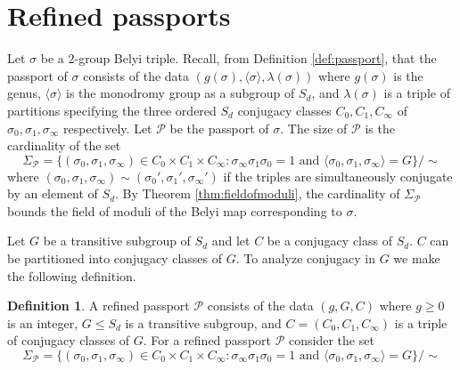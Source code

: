 \documentclass{dcthesis}
\newcommand{\defi}[1]{\textsf{#1}}
\numberwithin{equation}{section}
\theoremstyle{definition}
\newtheorem{definition}[equation]{Definition}
\theoremstyle{remark}
\begin{document}
{  \section{Refined passports}{\label{sec:refined}}{
    Let $\sigma$ be a $2$-group Belyi triple.
    Recall, from Definition \ref{def:passport},
    that the passport of $\sigma$
    consists of the data
    $(g(\sigma), \langle\sigma\rangle, \lambda(\sigma))$
    where $g(\sigma)$ is the genus,
    $\langle\sigma\rangle$ is the monodromy group
    as a subgroup of $S_d$,
    and $\lambda(\sigma)$ is a triple of partitions
    specifying the three ordered
    $S_d$
    conjugacy classes
    $C_0,C_1,C_\infty$
    of
    $\sigma_0,\sigma_1,\sigma_\infty$
    respectively.
    Let $\mathcal{P}$ be the passport
    of $\sigma$.
    The size of
    $\mathcal{P}$
    is the cardinality of the set
    \begin{equation}
      \label{eqn:coarse}
      \Sigma_\mathcal{P}
      =
      \{
        (\sigma_0,\sigma_1,\sigma_\infty)\in
        C_0\times C_1\times C_\infty:
        \sigma_\infty\sigma_1\sigma_0=1
        \text{ and }
        \langle\sigma_0,\sigma_1,\sigma_\infty\rangle=G
      \}/\sim
    \end{equation}
    where
    $(\sigma_0,\sigma_1,\sigma_\infty)\sim
    (\sigma_0',\sigma_1',\sigma_\infty')$
    if the triples are simultaneously conjugate
    by an element of $S_d$.
    By Theorem \ref{thm:fieldofmoduli},
    the cardinality of $\Sigma_\mathcal{P}$
    bounds the field of moduli of
    the Belyi map corresponding to $\sigma$.
    \par
    Let $G$ be a transitive subgroup of $S_d$
    and let $C$ be a conjugacy class of $S_d$.
    $C$ can be partitioned into
    conjugacy classes of $G$.
    To analyze conjugacy in $G$ we
    make the following definition.
    \begin{definition}\label{def:refined}
      A \defi{refined passport} $\mathscr{P}$ consists of the data
      $(g,G,C)$
      where $g\geq 0$ is an integer,
      $G\leq S_d$ is a transitive subgroup,
      and $C = (C_0,C_1,C_\infty)$
      is a triple of conjugacy classes of $G$.
      For a refined passport $\mathscr{P}$ consider the set
      \begin{equation}
        \label{eqn:refined}
        \Sigma_\mathscr{P} =
        \{(\sigma_0,\sigma_1,\sigma_\infty)\in C_0\times C_1\times C_\infty : \sigma_\infty\sigma_1\sigma_0=1\text{ and } \langle\sigma_0,\sigma_1,\sigma_\infty\rangle=G\}/\sim
      \end{equation}

\end{definition}}}
\end{document}
